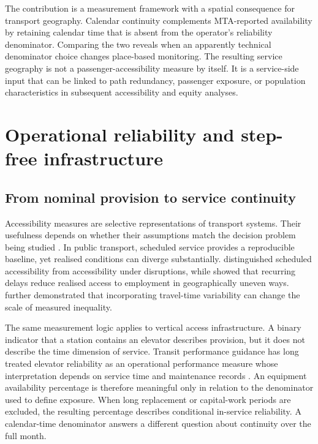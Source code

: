 The contribution is a measurement framework with a spatial consequence for transport geography. Calendar continuity complements MTA-reported availability by retaining calendar time that is absent from the operator's reliability denominator. Comparing the two reveals when an apparently technical denominator choice changes place-based monitoring. The resulting service geography is not a passenger-accessibility measure by itself. It is a service-side input that can be linked to path redundancy, passenger exposure, or population characteristics in subsequent accessibility and equity analyses.

\section{Operational reliability and step-free infrastructure}

\subsection{From nominal provision to service continuity}

Accessibility measures are selective representations of transport systems. Their usefulness depends on whether their assumptions match the decision problem being studied \citep{geurs2004}. In public transport, scheduled service provides a reproducible baseline, yet realised conditions can diverge substantially. \citet{liu2024} distinguished scheduled accessibility from accessibility under disruptions, while \citet{nichols2024} showed that recurring delays reduce realised access to employment in geographically uneven ways. \citet{braga2026} further demonstrated that incorporating travel-time variability can change the scale of measured inequality.

The same measurement logic applies to vertical access infrastructure. A binary indicator that a station contains an elevator describes provision, but it does not describe the time dimension of service. Transit performance guidance has long treated elevator reliability as an operational performance measure whose interpretation depends on service time and maintenance records \citep{tcrp2003}. An equipment availability percentage is therefore meaningful only in relation to the denominator used to define exposure. When long replacement or capital-work periods are excluded, the resulting percentage describes conditional in-service reliability. A calendar-time denominator answers a different question about continuity over the full month.

